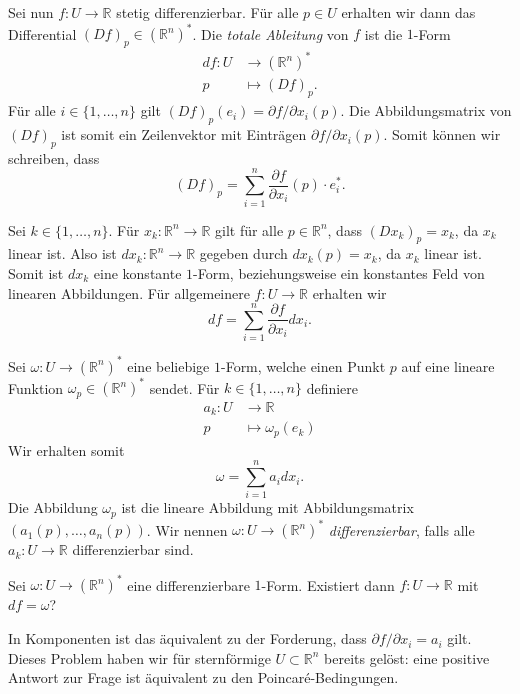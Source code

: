 \documentclass[../main.tex]{subfiles}
\begin{document}
Sei nun $f \colon U \to \mathbb{R}$
stetig differenzierbar.
Für alle $p \in U$ erhalten wir dann das Differential
${(Df)}_p \in {(\mathbb{R}^n)}^*$.
Die \emph{totale Ableitung} von $f$ ist die $1$-Form
\begin{align*}
  df \colon U & \to {(\mathbb{R}^n)}^* \\
  p & \mapsto {(Df)}_p.
\end{align*}
Für alle $i \in \{1, \dots, n\}$ gilt
${(Df)}_p(e_i) = \partial f / \partial x_i (p)$.
Die Abbildungsmatrix von ${(Df)}_p$ ist somit ein Zeilenvektor mit
Einträgen $\partial f/ \partial x_i (p)$.
Somit können wir schreiben, dass
\[
  {(Df)}_p =
  \sum_{i=1}^{n} \frac{\partial f}{\partial x_i}(p) \cdot e_i^*.
\]

Sei $k \in \{1, \dots, n\}$.
Für $x_k \colon \mathbb{R}^n \to \mathbb{R}$ gilt
für alle $p \in \mathbb{R}^n$, dass
${(Dx_k)}_p = x_k$, da $x_k$ linear ist.
Also ist $dx_k \colon \mathbb{R}^n \to \mathbb{R}$ 
gegeben durch $dx_k(p) = x_k$, da $x_k$ linear ist.
Somit ist $dx_k$ eine konstante $1$-Form,
beziehungsweise ein konstantes Feld von linearen Abbildungen.
Für allgemeinere $f \colon U \to \mathbb{R}$
erhalten wir
\[
  df = \sum_{i=1}^{n} \frac{\partial f}{\partial x_i} dx_i.
\]

Sei $\omega \colon U \to {(\mathbb{R}^n)}^*$ eine beliebige $1$-Form,
welche einen Punkt $p$ auf eine lineare Funktion $\omega_p
\in {(\mathbb{R}^n)}^*$ sendet.
Für $k \in \{1, \dots, n\}$ definiere
\begin{align*}
  a_k \colon U & \to \mathbb{R} \\
  p & \mapsto \omega_p(e_k)
\end{align*}
Wir erhalten somit
\[
  \omega = \sum_{i=1}^{n} a_i dx_i.
\]
Die Abbildung $\omega_p$ ist die lineare Abbildung
mit Abbildungsmatrix $(a_1(p), \dots, a_n(p))$.
Wir nennen  $\omega \colon U \to {(\mathbb{R}^n)}^*$ 
\emph{differenzierbar}, falls alle
$a_k \colon U \to \mathbb{R}$ differenzierbar sind.

\begin{question}
  Sei $\omega \colon U \to {(\mathbb{R}^n)}^*$ eine
  differenzierbare $1$-Form.
  Existiert dann $f \colon U \to \mathbb{R}$ mit
  $df = \omega$?
\end{question}

In Komponenten ist das äquivalent zu der Forderung,
dass
$\partial f / \partial x_i = a_i$
gilt.
Dieses Problem haben wir für sternförmige
$U \subset \mathbb{R}^n$ bereits gelöst:
eine positive Antwort zur Frage ist äquivalent zu
den Poincaré-Bedingungen.
\end{document}
